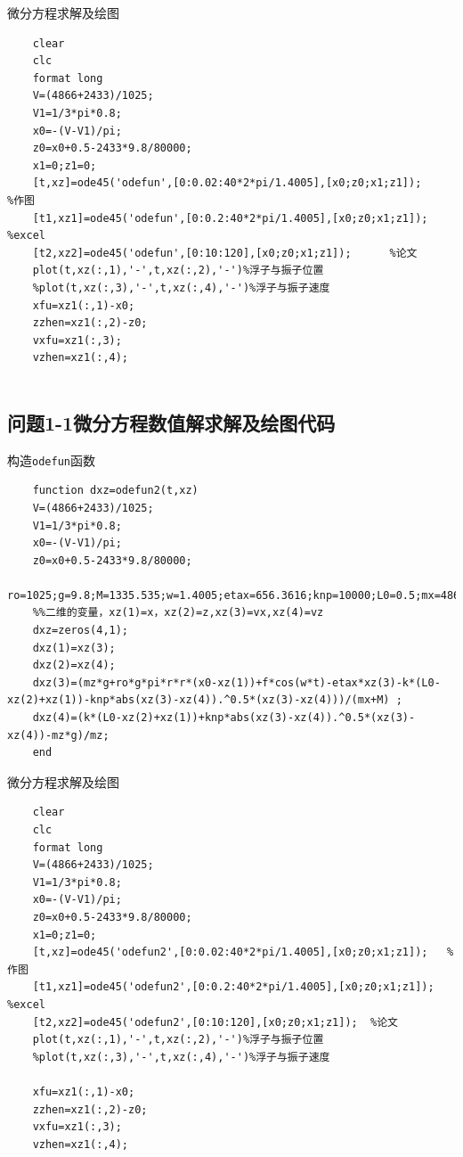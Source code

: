\documentclass{article}
\numberwithin{equation}{subsection}
\begin{document}
微分方程求解及绘图
\begin{lstlisting}
    clear
    clc
    format long
    V=(4866+2433)/1025;
    V1=1/3*pi*0.8;
    x0=-(V-V1)/pi;
    z0=x0+0.5-2433*9.8/80000;
    x1=0;z1=0;
    [t,xz]=ode45('odefun',[0:0.02:40*2*pi/1.4005],[x0;z0;x1;z1]);       %作图
    [t1,xz1]=ode45('odefun',[0:0.2:40*2*pi/1.4005],[x0;z0;x1;z1]);      %excel
    [t2,xz2]=ode45('odefun',[0:10:120],[x0;z0;x1;z1]);      %论文
    plot(t,xz(:,1),'-',t,xz(:,2),'-')%浮子与振子位置
    %plot(t,xz(:,3),'-',t,xz(:,4),'-')%浮子与振子速度
    xfu=xz1(:,1)-x0;
    zzhen=xz1(:,2)-z0;
    vxfu=xz1(:,3);
    vzhen=xz1(:,4);
    
\end{lstlisting}


\subsection{问题1-1微分方程数值解求解及绘图代码}
构造\verb|odefun|函数
\begin{lstlisting}
    function dxz=odefun2(t,xz)
    V=(4866+2433)/1025; 
    V1=1/3*pi*0.8; 
    x0=-(V-V1)/pi;
    z0=x0+0.5-2433*9.8/80000;
    ro=1025;g=9.8;M=1335.535;w=1.4005;etax=656.3616;knp=10000;L0=0.5;mx=4866;mz=2433;r=1;f=6250;k=80000;
    %%二维的变量，xz(1)=x，xz(2)=z,xz(3)=vx,xz(4)=vz 
    dxz=zeros(4,1); 
    dxz(1)=xz(3); 
    dxz(2)=xz(4);
    dxz(3)=(mz*g+ro*g*pi*r*r*(x0-xz(1))+f*cos(w*t)-etax*xz(3)-k*(L0-xz(2)+xz(1))-knp*abs(xz(3)-xz(4)).^0.5*(xz(3)-xz(4)))/(mx+M) ;
    dxz(4)=(k*(L0-xz(2)+xz(1))+knp*abs(xz(3)-xz(4)).^0.5*(xz(3)-xz(4))-mz*g)/mz; 
    end
\end{lstlisting}

微分方程求解及绘图
\begin{lstlisting}
    clear
    clc
    format long
    V=(4866+2433)/1025;
    V1=1/3*pi*0.8;
    x0=-(V-V1)/pi;
    z0=x0+0.5-2433*9.8/80000;
    x1=0;z1=0;
    [t,xz]=ode45('odefun2',[0:0.02:40*2*pi/1.4005],[x0;z0;x1;z1]);   %作图
    [t1,xz1]=ode45('odefun2',[0:0.2:40*2*pi/1.4005],[x0;z0;x1;z1]);     %excel
    [t2,xz2]=ode45('odefun2',[0:10:120],[x0;z0;x1;z1]);  %论文
    plot(t,xz(:,1),'-',t,xz(:,2),'-')%浮子与振子位置
    %plot(t,xz(:,3),'-',t,xz(:,4),'-')%浮子与振子速度
    
    xfu=xz1(:,1)-x0;
    zzhen=xz1(:,2)-z0;
    vxfu=xz1(:,3);
    vzhen=xz1(:,4);
    
\end{lstlisting}

        
\end{document}
